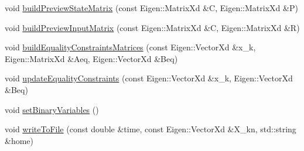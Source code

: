 \begin{DoxyCompactItemize}
\item 
void \hyperlink{classMIQPController_ad9a2e7d2c658937c847097f83d3408e3}{build\-Preview\-State\-Matrix} (const \-Eigen\-::\-Matrix\-Xd \&\-C, \-Eigen\-::\-Matrix\-Xd \&\-P)
\item 
void \hyperlink{classMIQPController_a9e4f007d1b6b7f68582aebbc09cf0813}{build\-Preview\-Input\-Matrix} (const \-Eigen\-::\-Matrix\-Xd \&\-C, \-Eigen\-::\-Matrix\-Xd \&\-R)
\item 
void \hyperlink{classMIQPController_a870c7d3c0e5fcfd46f7bb95924007082}{build\-Equality\-Constraints\-Matrices} (const \-Eigen\-::\-Vector\-Xd \&x\-\_\-k, \-Eigen\-::\-Matrix\-Xd \&\-Aeq, \-Eigen\-::\-Vector\-Xd \&\-Beq)
\item 
void \hyperlink{classMIQPController_a4c3f665528fae6c051160456692372ee}{update\-Equality\-Constraints} (const \-Eigen\-::\-Vector\-Xd \&x\-\_\-k, \-Eigen\-::\-Vector\-Xd \&\-Beq)
\item 
void \hyperlink{classMIQPController_afce6feca593352323e052b6c993cbf69}{set\-Binary\-Variables} ()
\item 
void \hyperlink{classMIQPController_a014cab392ddec6085df74f2590af4791}{write\-To\-File} (const double \&time, const \-Eigen\-::\-Vector\-Xd \&\-X\-\_\-kn, std\-::string \&home)
\end{DoxyCompactItemize}
